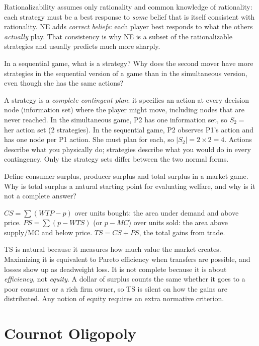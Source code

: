 \begin{description}
\begin{solution}
Rationalizability assumes only rationality and common knowledge of rationality: each strategy must be a best response to \emph{some} belief that is itself consistent with rationality. NE adds \emph{correct beliefs}: each player best responds to what the others \emph{actually} play. That consistency is why NE is a subset of the rationalizable strategies and usually predicts much more sharply.
\end{solution}
\item[3.3] In a sequential game, what is a strategy? Why does the second mover have more strategies in the sequential version of a game than in the simultaneous version, even though she has the same actions?
\begin{solution}
A strategy is a \emph{complete contingent plan}: it specifies an action at every decision node (information set) where the player might move, including nodes that are never reached. In the simultaneous game, P2 has one information set, so $S_2=$ her action set (2 strategies). In the sequential game, P2 observes P1's action and has one node per P1 action. She must plan for each, so $|S_2|=2\times2=4$. Actions describe what you physically do; strategies describe what you would do in every contingency. Only the strategy sets differ between the two normal forms.
\end{solution}
\item[3.4] Define consumer surplus, producer surplus and total surplus in a market game. Why is total surplus a natural starting point for evaluating welfare, and why is it not a complete answer?
\begin{solution}
$CS=\sum(WTP-p)$ over units bought: the area under demand and above price. $PS=\sum(p-WTS)$ (or $p-MC$) over units sold: the area above supply/MC and below price. $TS=CS+PS$, the total gains from trade.

TS is natural because it measures how much value the market creates. Maximizing it is equivalent to Pareto efficiency when transfers are possible, and losses show up as deadweight loss. It is not complete because it is about \emph{efficiency}, not \emph{equity}. A dollar of surplus counts the same whether it goes to a poor consumer or a rich firm owner, so TS is silent on how the gains are distributed. Any notion of equity requires an extra normative criterion.
\end{solution}
\end{description}

\section{Cournot Oligopoly}

